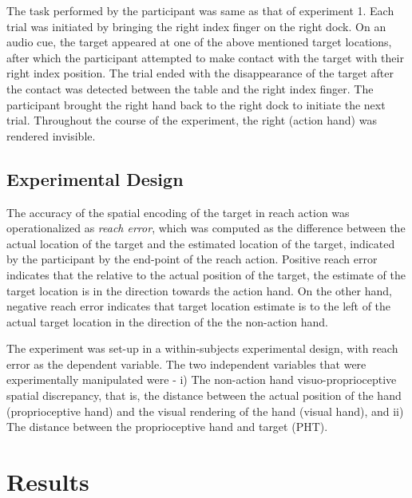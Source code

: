 The task performed by the participant was same as that of experiment 1. Each trial was initiated by bringing the right index finger on the right dock. On an audio cue, the target appeared at one of the above mentioned target locations, after which the participant attempted to make contact with the target with their right index position. The trial ended with the disappearance of the target after the contact was detected between the table and the right index finger. The participant brought the right hand back to the right dock to initiate the next trial. Throughout the course of the experiment, the right (action hand) was rendered invisible. 



\subsection{Experimental Design}

The accuracy of the spatial encoding of the target in reach action was operationalized as \textit{reach error}, which was computed as the difference between the actual location of the target and the estimated location of the target, indicated by the participant by the end-point of the reach action. Positive reach error indicates that the relative to the actual position of the target, the estimate of the target location is in the direction towards the action hand. On the other hand, negative reach error indicates that target location estimate is to the left of the actual target location in the direction of the the non-action hand. 

The experiment was set-up in a within-subjects experimental design, with reach error as the dependent variable. The two independent variables that were experimentally manipulated were - i) The non-action hand visuo-proprioceptive spatial discrepancy, that is, the distance between the actual position of the hand (proprioceptive hand) and the visual rendering of the hand (visual hand), and ii) The distance between the proprioceptive hand and target (PHT). 

\section{Results}



